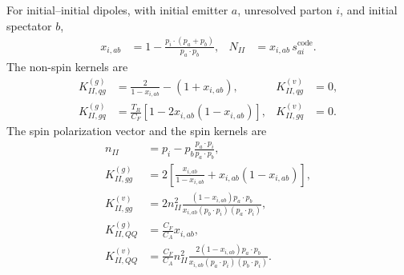 \documentclass[11pt]{article}
\begin{document}
For initial--initial dipoles, with initial emitter $a$, unresolved parton $i$, and initial spectator $b$,
\begin{align}
x_{i,ab} &= 1-\frac{p_i\!\cdot(p_a+p_b)}{p_a\!\cdot p_b},
&N_{II}&=x_{i,ab}\,s_{ai}^{\text{code}}.
\end{align}
The non-spin kernels are
\begin{align}
K^{(g)}_{II,qg} &= \frac{2}{1-x_{i,ab}}-(1+x_{i,ab}),
&K^{(v)}_{II,qg}&=0,\\
K^{(g)}_{II,gq} &= \frac{T_R}{C_F}\left[1-2x_{i,ab}(1-x_{i,ab})\right],
&K^{(v)}_{II,gq}&=0.
\end{align}
The spin polarization vector and the spin kernels are
\begin{align}
n_{II}&=p_i-p_b\frac{p_a\!\cdot p_i}{p_a\!\cdot p_b},\\
K^{(g)}_{II,gg} &=2\left[\frac{x_{i,ab}}{1-x_{i,ab}}+x_{i,ab}(1-x_{i,ab})\right],\\
K^{(v)}_{II,gg} &=2 n_{II}^2\frac{(1-x_{i,ab})p_a\!\cdot p_b}{x_{i,ab}(p_b\!\cdot p_i)(p_a\!\cdot p_i)},\\
K^{(g)}_{II,QQ} &=\frac{C_F}{C_A}x_{i,ab},\\
K^{(v)}_{II,QQ} &=\frac{C_F}{C_A}n_{II}^2\frac{2(1-x_{i,ab})p_a\!\cdot p_b}{x_{i,ab}(p_a\!\cdot p_i)(p_b\!\cdot p_i)}.
\end{align}
\end{document}
